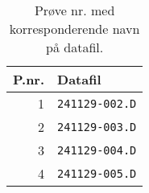 \begin{table}[htbp]
	\centering
	\caption{Prøve nr. med korresponderende navn på datafil.}
	\begin{tabular}{rl}\toprule
		P.nr. & Datafil               \\\midrule
		1     & \texttt{241129-002.D} \\
		2     & \texttt{241129-003.D} \\
		3     & \texttt{241129-004.D} \\
		4     & \texttt{241129-005.D} \\\bottomrule
	\end{tabular}
	\label{tab:nr-to-data}
\end{table}
